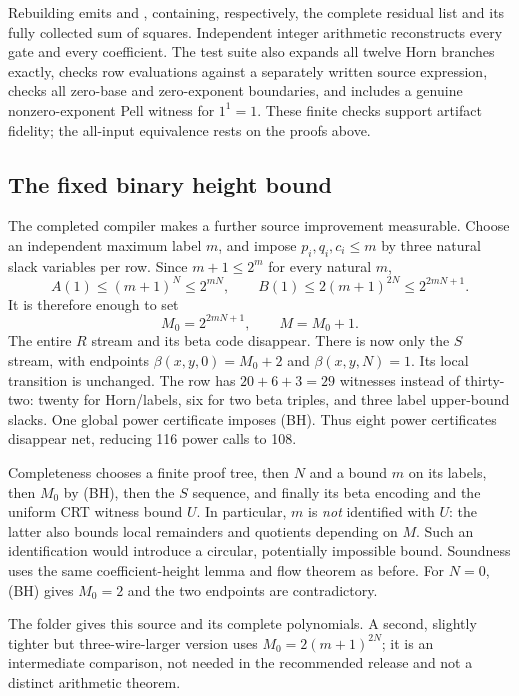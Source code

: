 \documentclass[11pt]{article}
\begin{document}
Rebuilding emits  and , containing,
respectively, the complete residual list and its fully collected sum of
squares. Independent integer arithmetic reconstructs every gate and every
coefficient. The test suite also expands all twelve Horn branches exactly,
checks row evaluations against a separately written source expression,
checks all zero-base and zero-exponent boundaries, and includes a genuine
nonzero-exponent Pell witness for $1^1=1$. These finite checks support
artifact fidelity; the all-input equivalence rests on the proofs above.

\subsection{The fixed binary height bound}

The completed compiler makes a further source improvement measurable.
Choose an independent maximum label $m$, and impose
$p_i,q_i,c_i\leq m$ by three natural slack variables per row. Since
$m+1\leq2^m$ for every natural $m$,
\[
 A(1)\leq(m+1)^N\leq2^{mN},\qquad
 B(1)\leq2(m+1)^{2N}\leq2^{2mN+1}.
\]
It is therefore enough to set
\[
 M_0=2^{2mN+1},\qquad M=M_0+1.
 \tag{BH}
\]
The entire $R$ stream and its beta code disappear. There is now only the
$S$ stream, with endpoints $\beta(x,y,0)=M_0+2$ and
$\beta(x,y,N)=1$. Its local transition is unchanged. The row has
$20+6+3=29$ witnesses instead of thirty-two: twenty for Horn/labels,
six for two beta triples, and three label upper-bound slacks. One global
power certificate imposes (BH). Thus eight power certificates disappear
net, reducing 116 power calls to 108.

Completeness chooses a finite proof tree, then $N$ and a bound $m$ on
its labels, then $M_0$ by (BH), then the $S$ sequence, and finally its
beta encoding and the uniform CRT witness bound $U$. In particular,
$m$ is \emph{not} identified with $U$: the latter also bounds local
remainders and quotients depending on $M$. Such an identification would
introduce a circular, potentially impossible bound. Soundness uses the
same coefficient-height lemma and flow theorem as before. For $N=0$,
(BH) gives $M_0=2$ and the two endpoints are contradictory.

The folder  gives this source and its complete
polynomials. A second, slightly tighter but three-wire-larger version
uses $M_0=2(m+1)^{2N}$; it is an intermediate comparison, not needed
in the recommended release and not a distinct arithmetic theorem.
\end{document}
